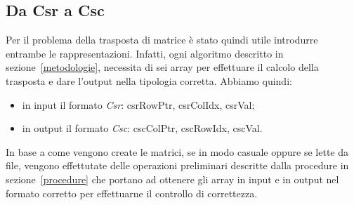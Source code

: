 \documentclass[]{IEEEtran}
\begin{document}
\subsection{Da Csr a Csc}
\label{csr-to-csc}
Per il problema della trasposta di matrice è stato quindi utile introdurre entrambe le rappresentazioni. Infatti, ogni algoritmo  descritto in sezione~\ref{metodologie}, necessita di sei array per effettuare il calcolo della trasposta e dare l'output nella tipologia corretta. Abbiamo quindi:
\begin{itemize}
 \item in input il formato \textit{Csr}: csrRowPtr, csrColIdx, csrVal;
 \item in output il formato \textit{Csc}: cscColPtr, cscRowIdx, cscVal.	
\end{itemize}
In base a come vengono create le matrici, se in modo casuale oppure se lette da file, vengono effettutate delle operazioni preliminari descritte dalla procedure in sezione~\ref{procedure} che portano ad ottenere gli array in input e in output nel formato corretto per effettuarne il controllo di correttezza.\newline


	







		


\end{document}
